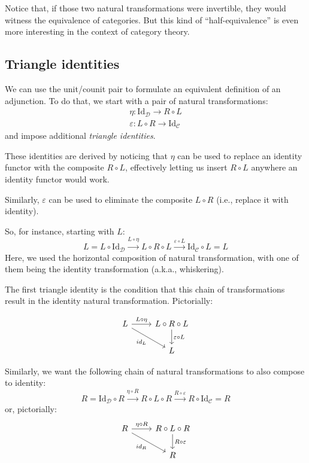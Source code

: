 \documentclass[DaoFP]{subfiles}
\begin{document}
Notice that, if those two natural transformations were invertible, they would witness the equivalence of categories. But this kind of ``half-equivalence'' is even more interesting in the context of category theory. 

\subsection{Triangle identities}

We can use the unit/counit pair to formulate an equivalent  definition of an adjunction. To do that, we start with a pair of natural transformations:
\begin{align*}
\eta \colon \text{Id}_{\mathcal{D}} \to R \circ L \\
\varepsilon \colon L \circ R \to \text{Id}_{\mathcal{C}} 
\end{align*}
and impose additional \emph{triangle identities}. 

These identities are derived by noticing that $\eta$ can be used to replace an identity functor with the composite $R \circ L$, effectively letting us insert $R \circ L$ anywhere an identity functor would work.

Similarly, $\varepsilon$ can be used to eliminate the composite $L \circ R$ (i.e., replace it with identity). 

So, for instance, starting with $L$:
\[ L = L \circ \text{Id}_{\mathcal{D}} \xrightarrow{L \circ \eta} L \circ R \circ L \xrightarrow{\varepsilon \circ L} \text{Id}_{\mathcal{C}} \circ L = L \]
Here, we used the horizontal composition of natural transformation, with one of them being the identity transformation (a.k.a., whiskering).

The first triangle identity is the condition that this chain of transformations result in the identity natural transformation. Pictorially:

\[
 \begin{tikzcd}
 L
 \arrow[r, "L \circ \eta"]
 \arrow[rd, "id_L"']
 & L \circ R \circ L
 \arrow[d, "\varepsilon \circ L"]
 \\
 & L
  \end{tikzcd}
\]

Similarly, we want the following chain of natural transformations to also compose to identity:
\[ R = \text{Id}_{\mathcal{D}} \circ R \xrightarrow{\eta \circ R} R \circ L \circ R \xrightarrow{R \circ \varepsilon} R \circ \text{Id}_{\mathcal{C}} = R \]
or, pictorially:
\[
 \begin{tikzcd}
 R
 \arrow[r, "\eta \circ R"]
 \arrow[rd, "id_R"']
 & R \circ L \circ R
 \arrow[d, "R \circ \varepsilon"]
 \\
 & R
  \end{tikzcd}
\]
\end{document}
